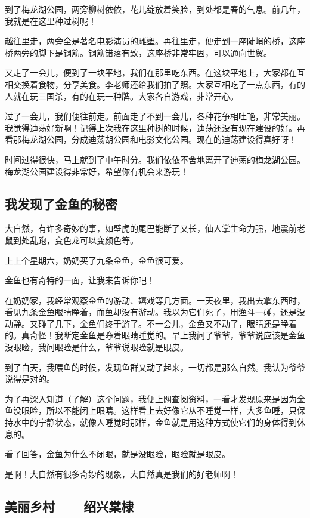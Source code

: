 \documentclass[UTF8,a4paper,titlepage,twoside,10.5pt]{article}
\begin{document}
到了梅龙湖公园，两旁柳树依依，花儿绽放着笑脸，到处都是春的气息。前几年，我就是在这里种过树呢！

越往里走，两旁全是著名电影演员的雕塑。再往里走，便走到一座陡峭的桥，这座桥两旁的脚下是钢筋。钢筋错落有致，这座桥非常牢固，可以通向世贸。

又走了一会儿，便到了一块平地，我们在那里吃东西。在这块平地上，大家都在互相交换着食物，分享美食。李老师还给我们拍了照。大家互相吃了一点东西，有的人就在玩三国杀，有的在玩一种牌。大家各自游戏，非常开心。

过了一会儿，我们便往前走。前面走了不到一会儿，各种花争相吐艳，非常美丽。我觉得迪荡好新啊！记得上次我在这里种树的时候，迪荡还没有现在建设的好。再看那梅龙湖公园，分成迪荡胡公园和电影文化公园。现在的迪荡建设得真好呀！

时间过得很快，马上就到了中午时分。我们依依不舍地离开了迪荡的梅龙湖公园。梅龙湖公园建设得非常好，希望你有机会来游玩！

\subsection{我发现了金鱼的秘密}
\label{sec:org57f6e20}

大自然，有许多奇妙的事，如壁虎的尾巴能断了又长，仙人掌生命力强，地震前老鼠到处乱跑，变色龙可以变颜色等。

上上个星期六，奶奶买了九条金鱼，金鱼很可爱。

金鱼也有奇特的一面，让我来告诉你吧！

在奶奶家，我经常观察金鱼的游动、嬉戏等几方面。一天夜里，我出去拿东西时，看见九条金鱼眼睛睁着，而鱼却没有游动。我以为它们死了，用渔斗一碰，还是没动静。又碰了几下，金鱼们终于游了。不一会儿，金鱼又不动了，眼睛还是睁着的。真奇怪！我断定金鱼是睁着眼睛睡觉的。早上我问了爷爷，爷爷说应该是金鱼没眼睑，我问眼睑是什么，爷爷说眼睑就是眼皮。

到了白天，我喂鱼的时候，发现鱼群又动了起来，一切都是那么自然。我认为爷爷说得是对的。

为了再深入知道（了解）这个问题，我便上网查阅资料，一看才发现原来是因为金鱼没眼睑，所以不能闭上眼睛。这样看上去好像它从不睡觉一样，大多鱼睡，只保持水中的宁静状态，就像人睡觉时那样，金鱼就是用这种方式使它们的身体得到休息的。

看了回答，金鱼为什么不闭眼，就是没眼睑，眼睑就是眼皮。

是啊！大自然有很多奇妙的现象，大自然真是我们的好老师啊！

\subsection{美丽乡村——绍兴棠棣}
\label{sec:org88a686e}
\end{document}
